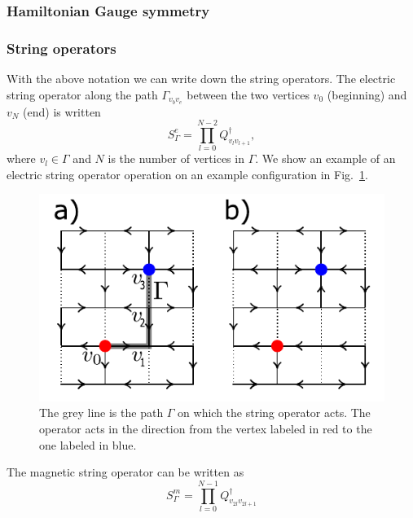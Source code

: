 \documentclass[aps,floatfix,11pt,twocolumn]{revtex4-1}
\begin{document}
        \subsubsection{Hamiltonian Gauge symmetry }


        \subsubsection{String operators}
            With the above notation we can write down the string operators. The electric string operator along
            the path $\Gamma_{v_b v_e}$ between the two vertices $v_0$ (beginning) and $v_N$ (end) is written
            \begin{equation}
                S^e_{\Gamma} = \prod_{l=0}^{N-2} Q_{v_lv_{l+1}}^\dagger
                ,
            \end{equation}
            where $v_l \in \Gamma$ and $N$ is the number of vertices in $\Gamma$. We show an example of an
            electric string operator operation on an example configuration in Fig.~\ref{fig:example_elec_string}.
            \begin{figure}[htpb]
                \centering
                \includegraphics[width=0.8\linewidth]{example_elec_string.pdf}
                \caption{The grey line is the path $\Gamma$ on which the string operator acts. The operator acts
            in the direction from the vertex labeled in red to the one labeled in blue.}
                \label{fig:example_elec_string}
            \end{figure}
            The magnetic string operator can be written as
            \begin{equation}
                S^m_{\Gamma} = \prod_{l=0}^{N-1} Q_{v_{2l}v_{2l+1}}^\dagger
            \end{equation}
\end{document}
